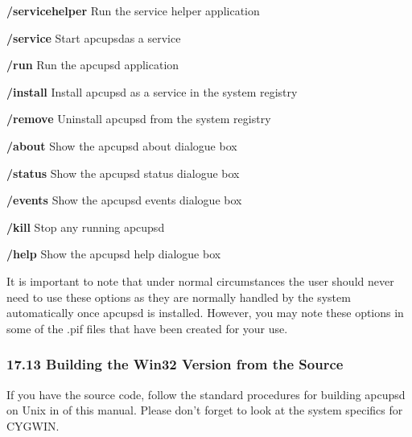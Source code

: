 \begin{description}

\item {\bf /servicehelper}
Run the service helper application  

\item {\bf /service}
Start apcupsdas a service  

\item {\bf /run}
Run the apcupsd application  

\item {\bf /install}
Install apcupsd as a service in the system registry  

\item {\bf /remove}
Uninstall apcupsd from the system registry  

\item {\bf /about}
Show the apcupsd about dialogue box  

\item {\bf /status}
Show the apcupsd status dialogue box  

\item {\bf /events}
Show the apcupsd events dialogue box  

\item {\bf /kill}
Stop any running apcupsd  

\item {\bf /help}
Show the apcupsd help dialogue box 
\end{description}

It is important to note that under normal circumstances the user should never
need to use these options as they are normally handled by the system
automatically once apcupsd is installed. However, you may note these options
in some of the .pif files that have been created for your use. 

\label{Building-the-Win32-Version-from-the-Source}

\subsubsection*{17.13 Building the Win32 Version from the Source}

\label{index-Windows_002c-Building-187}
\label{index-Building_002c-Windows-188}
If you have the source code, follow the standard procedures for building
apcupsd on Unix in 
 of this manual. Please
don't forget to look at the system specifics for CYGWIN. 

